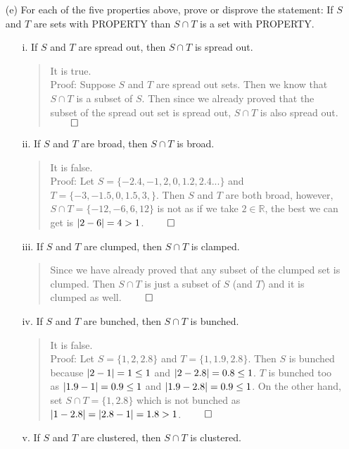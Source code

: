 \documentclass[12pt, a4paper]{article}                      %
\newcommand{\reals}{\mathbb{R}}
\DeclarePairedDelimiter\abs{\lvert}{\rvert}
\begin{document}
\begin{itemize}
\begin{itemize}
\item[]
\item[(e)]
For each of the five properties above, prove or disprove the statement:
If $S$ and $T$ are sets with PROPERTY than $S \cap T$ is a set with PROPERTY.
\begin{itemize}
\item[i.]
If $S$ and $T$ are spread out, then $S \cap T$ is spread out.
\begin{quote}
It is true.\\
Proof: Suppose $S$ and $T$ are spread out sets. Then we know that $S \cap T$
is a subset of $S$. Then since we already proved that the subset of the spread
out set is spread out, $S \cap T$ is also spread out. $\qed$
\end{quote}
\item[]
\item[ii.]
If $S$ and $T$ are broad, then $S \cap T$ is broad.
\begin{quote}
It is false.\\
Proof: Let $S = \{-2.4, -1,2, 0, 1.2, 2.4 ...\}$ and $T = \{-3, -1.5, 0, 1.5, 3, \}$.
Then $S$ and $T$ are both broad, however, $S \cap T = \{-12, -6, 6, 12\}$ is not as if we take
$2 \in \reals$, the best we can get is $\abs{2 - 6} = 4 > 1$. $\qed$
\end{quote}
\item[]
\item[iii.]
If $S$ and $T$ are clumped, then $S \cap T$ is clamped.
\begin{quote}
Since we have already proved that any subset of the clumped set is clumped.
Then $S \cap T$ is just a subset of $S$ (and $T$) and it is clumped as well. $\qed$
\end{quote}
\item[]
\item[iv.]
If $S$ and $T$ are bunched, then $S \cap T$ is bunched.
\begin{quote}
It is false.\\
Proof: Let $S = \{1, 2, 2.8\}$ and $T = \{1, 1.9, 2.8\}$. Then $S$ is bunched
because $\abs{2 - 1} = 1 \leq 1$ and $\abs{2 - 2.8} = 0.8 \leq 1$.
$T$ is bunched too as $\abs{1.9 - 1} = 0.9 \leq 1$ and $\abs{1.9 - 2.8} = 0.9 \leq 1$.
On the other hand, set $S \cap T = \{1, 2.8\}$ which is not bunched as $\abs{1 - 2.8} = \abs{2.8 - 1} = 1.8 > 1$.
$\qed$
\end{quote}
\item[]
\item[v.]
If $S$ and $T$ are clustered, then $S \cap T$ is clustered.

\end{itemize}
\end{itemize}
\end{itemize}
\end{document}
